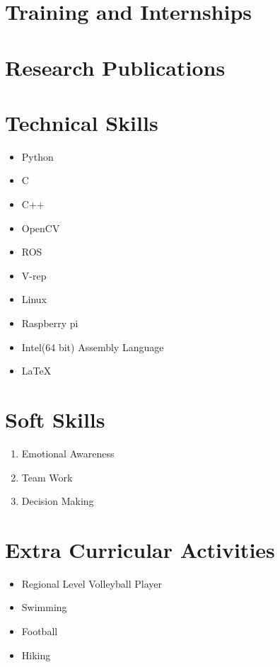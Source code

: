 \documentclass[11pt,a4paper,sans]{moderncv} %
\begin{document}
\section{Training and Internships}

\section{Research Publications}

	
\section{Technical Skills}
	
	\begin{itemize}
		\item Python
		\item C
		\item C++
		\item OpenCV
		\item ROS
		\item V-rep
		\item Linux
		\item Raspberry pi
		\item Intel(64 bit) Assembly Language
		\item \LaTeX
		
		
		
	\end{itemize}
	
\section{Soft Skills}
	\begin{enumerate}
		
		\item Emotional Awareness
		\newline{}
		\item Team Work
		\newline{}
		\item Decision Making
		\newline{}
	\end{enumerate}

\section{Extra Curricular Activities}
		\begin{itemize}			
			\item Regional Level Volleyball Player
			\newline{}
			\item Swimming
			\newline{}
			\item Football
			\newline{}
			\item Hiking 
	\end{itemize}	
\end{document}
